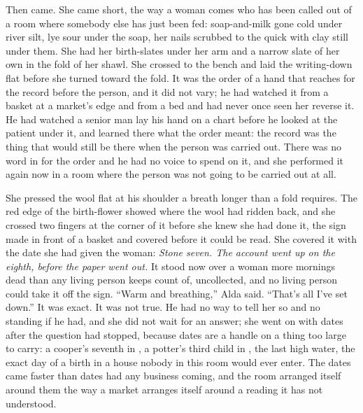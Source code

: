 Then  came. She came short, the way a woman comes who has been called out of a room where somebody else has just been fed: soap-and-milk gone cold under river silt, lye sour under the soap, her nails scrubbed to the quick with clay still under them. She had her birth-slates under her arm and a narrow slate of her own in the fold of her shawl. She crossed to the bench and laid the writing-down flat before she turned toward the fold. It was the order of a hand that reaches for the record before the person, and it did not vary; he had watched it from a basket at a market's edge and from a bed and had never once seen her reverse it. He had watched a senior man lay his hand on a chart before he looked at the patient under it, and learned there what the order meant: the record was the thing that would still be there when the person was carried out. There was no word in  for the order and he had no voice to spend on it, and she performed it again now in a room where the person was not going to be carried out at all.

She pressed the wool flat at his shoulder a breath longer than a fold requires. The red edge of the birth-flower showed where the wool had ridden back, and she crossed two fingers at the corner of it before she knew she had done it, the sign made in front of a basket and covered before it could be read. She covered it with the date she had given the woman: \emph{Stone seven. The account went up on the eighth, before the paper went out.} It stood now over a woman more mornings dead than any living person keeps count of, uncollected, and no living person could take it off the sign. “Warm and breathing,” Alda said. “That's all I've set down.” It was exact. It was not true. He had no way to tell her so and no standing if he had, and she did not wait for an answer; she went on with dates after the question had stopped, because dates are a handle on a thing too large to carry: a cooper's seventh in , a potter's third child in , the last high water, the exact day of a birth in a house nobody in this room would ever enter. The dates came faster than dates had any business coming, and the room arranged itself around them the way a market arranges itself around a reading it has not understood.

